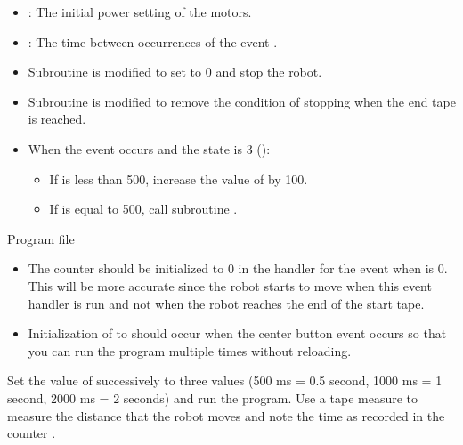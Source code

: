 
\begin{itemize}
\item {}: The initial power setting of the motors.

\item {}: The time between occurrences of the event .  
\end{itemize}


\begin{itemize}

\item Subroutine  is modified to set
 to 0 and stop the robot.

\item Subroutine  is modified to remove the condition
of stopping when the end tape is reached.

\item When the  event occurs and the state is 3
():
\begin{itemize}
\item If  is less than 500, increase the value of  by 100.
\item If  is equal to 500, call subroutine .
\end{itemize}


\end{itemize}


{\raggedleft \hfill Program file }

\begin{itemize}

\item The counter  should be initialized to 0 in the
handler for the  event when  is 0. This will be more
accurate since the robot starts to move when this event handler is run
and not when the robot reaches the end of the start tape.

\item Initialization of  to  should occur when the
center button event occurs so that you can run the program multiple
times without reloading.

\end{itemize}

 Set the value of 
successively to three values (500 ms = 0.5 second, 1000 ms = 1 second,
2000 ms = 2 seconds) and run the program. Use a tape measure to measure
the distance that the robot moves and note the time as recorded in the
counter .


